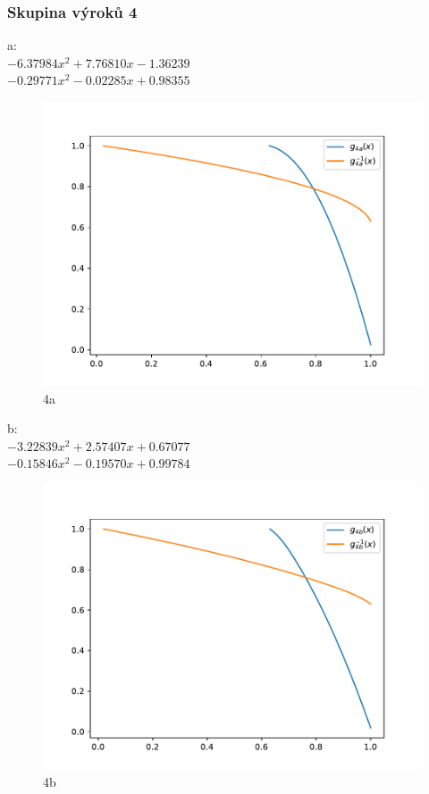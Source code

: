 \subsubsection{Skupina výrok\r u 4}
a:\\
$-6.37984x^2+7.76810x-1.36239$\\
$-0.29771x^2-0.02285x+0.98355$\\
\begin{figure}[H]
    \caption{4a}
        \hspace{-1cm}
        \includegraphics[scale=0.5]{template-fig/p6.pdf}
        \centering
\end{figure}
b:\\
$-3.22839x^2+2.57407x+0.67077$\\
$-0.15846x^2-0.19570x+0.99784$\\
\begin{figure}[H]
    \caption{4b}
        \hspace{-1cm}
        \includegraphics[scale=0.5]{template-fig/p7.pdf}
        \centering
\end{figure}
